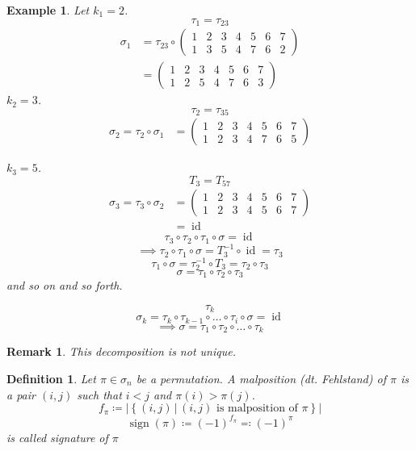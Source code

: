 \documentclass{article}
\newtheorem{example}{Example}  \numberwithin{example}{section}
\newtheorem{definition}{Definition}  \numberwithin{definition}{section}
\newtheorem{remark}{Remark}  \numberwithin{remark}{section}
\newcommand{\setdef}[2]{\left\{\left.#1\,\right|\,#2\right\}}
\newcommand{\card}[1]{\left|#1\right|}
\DeclareMathOperator{\sign}{sign}
\begin{document}
\begin{example}
  Let $k_1 = 2$.
  \[ \tau_1 = \tau_{23} \]
  \begin{align*}
    \sigma_1 &= \tau_{23} \circ \begin{pmatrix} 1 & 2 & 3 & 4 & 5 & 6 & 7 \\ 1 & 3 & 5 & 4 & 7 & 6 & 2 \end{pmatrix} \\
      &= \begin{pmatrix} 1 & 2 & 3 & 4 & 5 & 6 & 7 \\ 1 & 2 & 5 & 4 & 7 & 6 & 3 \end{pmatrix}
  \end{align*}
  $k_2 = 3$.
  \[ \tau_2 = \tau_{35} \]
  \begin{align*}
    \sigma_2 = \tau_2 \circ \sigma_1 &= \begin{pmatrix} 1 & 2 & 3 & 4 & 5 & 6 & 7 \\ 1 & 2 & 3 & 4 & 7 & 6 & 5 \end{pmatrix}
  \end{align*}

  $k_3 = 5$.
  \[ T_3 = T_{57} \]
  \begin{align*}
    \sigma_3 = \tau_3 \circ \sigma_2 &= \begin{pmatrix} 1 & 2 & 3 & 4 & 5 & 6 & 7 \\ 1 & 2 & 3 & 4 & 5 & 6 & 7 \end{pmatrix} \\
      &= \operatorname{id}
  \end{align*}
  \[ \tau_3 \circ \tau_2 \circ \tau_1 \circ \sigma = \operatorname{id} \]
  \[ \implies \tau_2 \circ \tau_1 \circ \sigma = T_3^{-1} \circ \operatorname{id} = \tau_3 \]
  \[ \tau_1 \circ \sigma = \tau_2^{-1} \circ T_3 = \tau_2 \circ \tau_3 \]
  \[ \sigma = \tau_1 \circ \tau_2 \circ \tau_3 \]
  and so on and so forth.

  \[ \tau_k \]
  \[ \sigma_k = \tau_k \circ \tau_{k-1} \circ \dots \circ \tau_{i} \circ \sigma = \operatorname{id} \]
  \[ \implies \sigma = \tau_1 \circ \tau_2 \circ \dots \circ \tau_k \]
\end{example}

\begin{remark}
  This decomposition is not unique.
\end{remark}

\begin{definition} %
  Let $\pi \in \sigma_n$ be a permutation.
  A \emph{malposition} (dt. \foreignlanguage{german}{Fehlstand}) of $\pi$ is a pair $(i,j)$ such that $i < j$ and $\pi(i) > \pi(j)$.
  \[ f_\pi \coloneqq \card{\setdef{(i,j)}{(i,j) \text{ is malposition of } \pi}} \]
  \[ \sign(\pi) \coloneqq (-1)^{f_\pi} \eqqcolon (-1)^\pi \]
  is called \emph{signature of $\pi$}
\end{definition}
\end{document}
